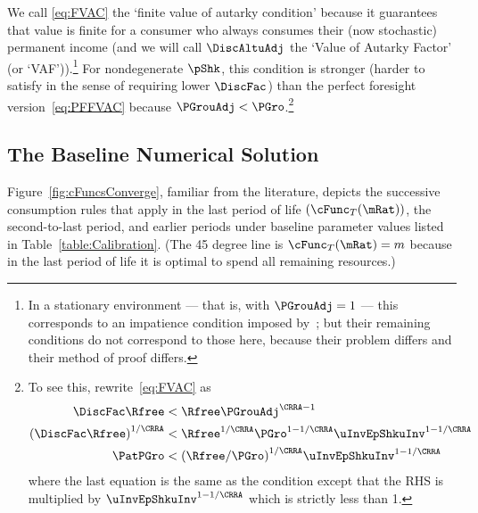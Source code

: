 \documentclass[BufferStockTheory]{subfiles}
\begin{document}
We call \eqref{eq:FVAC} the `finite value of autarky condition' because it guarantees that value is finite for a consumer who always consumes their
(now stochastic) permanent income (and we will call $\DiscAltuAdj$ the `Value of Autarky Factor' (or `VAF')).\footnote{In a stationary environment --- that is, with $\PGrouAdj=1$ --- this corresponds to an impatience condition imposed by~\cite{mstIncFluct}; but their remaining conditions do not correspond to those here, because their problem differs and their method of proof differs.}  For nondegenerate $\pShk$, this
condition is stronger
(harder to satisfy in the sense of requiring lower $\DiscFac$) than
the perfect foresight version~\eqref{eq:PFFVAC} because $\PGrouAdj <
\PGro$.\footnote{To see this, rewrite~\eqref{eq:FVAC} as
  \begin{align*}
    \DiscFac \Rfree & < \Rfree \PGrouAdj^{\CRRA-1}
    \\ {(\DiscFac \Rfree)}^{1/\CRRA}  & < \Rfree^{1/\CRRA} \PGro^{1-1/\CRRA} \uInvEpShkuInv^{1-1/\CRRA}
    \\ \PatPGro & < {(\Rfree/\PGro)}^{1/\CRRA} \uInvEpShkuInv^{1-1/\CRRA}
  \end{align*}
  where the last equation is the same as the {\PFFVAC} condition except that the
  RHS is multiplied by $\uInvEpShkuInv^{1-1/\CRRA}$ which is strictly less than 1.}


\hypertarget{Baseline-Numerical-Solution}{}
\subsection{The Baseline Numerical Solution}

Figure~\ref{fig:cFuncsConverge}, familiar from the literature, depicts the successive consumption rules that apply in the last period of life $(\cFunc_{T}(\mRat))$, the second-to-last period, and earlier periods under baseline parameter values listed in Table~\ref{table:Calibration}.  (The 45 degree line is $\cFunc_{T}(\mRat) = m$ because in the last period of life it is optimal to spend all remaining resources.)

\hypertarget{Calibration}{}



\hypertarget{Symbols}{}




\renewcommand{\figName}{Convergence-of-the-Consumption-Rules} %
\renewcommand{\figFile}{cFuncsConverge} %
\end{document}
